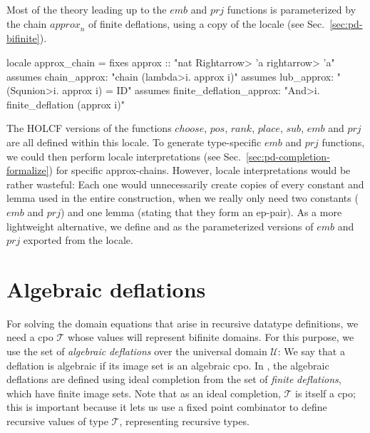 Most of the theory leading up to the $\mathit{emb}$ and $\mathit{prj}$ functions is parameterized by the chain $\mathit{approx}_n$ of finite deflations, using a copy of the  locale (see Sec.~\ref{sec:pd-bifinite}).
%
\begin{isacode}
locale approx_chain =
  fixes approx :: "nat \<Rightarrow> 'a \<rightarrow> 'a"
  assumes chain_approx: "chain (\<lambda>i. approx i)"
  assumes lub_approx: "(\<Squnion>i. approx i) = ID"
  assumes finite_deflation_approx: "\<And>i. finite_deflation (approx i)"
\end{isacode}
%
The HOLCF versions of the functions $\mathit{choose}$, $\mathit{pos}$, $\mathit{rank}$, $\mathit{place}$, $\mathit{sub}$, $\mathit{emb}$ and $\mathit{prj}$ are all defined within this locale. To generate type-specific $\mathit{emb}$ and $\mathit{prj}$ functions, we could then perform locale interpretations (see Sec.~\ref{sec:pd-completion-formalize}) for specific approx-chains. However, locale interpretations would be rather wasteful: Each one would unnecessarily create copies of every constant and lemma used in the entire construction, when we really only need two constants ($\mathit{emb}$ and $\mathit{prj}$) and one lemma (stating that they form an ep-pair). As a more lightweight alternative, we define  and  as the parameterized versions of $\mathit{emb}$ and $\mathit{prj}$ exported from the locale.

\section{Algebraic deflations}
\label{sec:universal-alg-defl}

For solving the domain equations that arise in recursive datatype definitions, we need a cpo $\mathcal{T}$ whose values will represent bifinite domains. For this purpose, we use the set of \emph{algebraic} \emph{deflations} over the universal domain $\mathcal{U}$: We say that a deflation is algebraic if its image set is an algebraic cpo. In , the algebraic deflations are defined using ideal completion from the set of \emph{finite} \emph{deflations}, which have finite image sets. Note that as an ideal completion, $\mathcal{T}$ is itself a cpo; this is important because it lets us use a fixed point combinator to define recursive values of type $\mathcal{T}$, representing recursive types.

